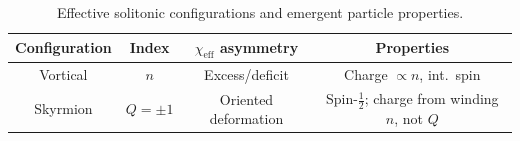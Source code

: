     \begin{table}[htbp]
      \centering
      \caption{Effective solitonic configurations and
      emergent particle properties.}
      \label{tab:solitons_charge}
      \begin{tabular}{|c|c|c|c|}
        \hline
        \textbf{Configuration} &
        \textbf{Index} &
        \textbf{$\chi_{\mathrm{eff}}$ asymmetry} &
        \textbf{Properties} \\
        \hline
        Vortical & $n$ &
        Excess/deficit &
        Charge $\propto n$, int.\ spin \\
        \hline
        Skyrmion & $Q=\pm 1$ &
        Oriented deformation &
        Spin-$\tfrac{1}{2}$; charge from winding $n$, not $Q$ \\
        \hline
      \end{tabular}
    \end{table}
